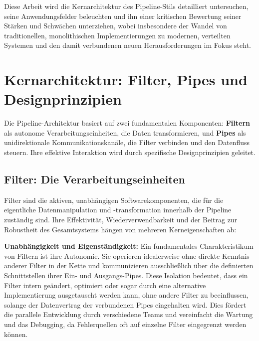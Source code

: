 \documentclass[10pt]{article}
\begin{document}
\begin{multicols}{2}
Diese Arbeit wird die Kernarchitektur des Pipeline-Stils detailliert untersuchen, seine Anwendungsfelder beleuchten und ihn einer kritischen Bewertung seiner Stärken und Schwächen unterziehen, wobei insbesondere der Wandel von traditionellen, monolithischen Implementierungen zu modernen, verteilten Systemen und den damit verbundenen neuen Herausforderungen im Fokus steht.

\section{Kernarchitektur: Filter, Pipes und Designprinzipien}
Die Pipeline-Architektur basiert auf zwei fundamentalen Komponenten: \textbf{Filtern} als autonome Verarbeitungseinheiten, die Daten transformieren, und \textbf{Pipes} als unidirektionale Kommunikationskanäle, die Filter verbinden und den Datenfluss steuern.\cite{richards2020, oreilly_python_pipes} Ihre effektive Interaktion wird durch spezifische Designprinzipien geleitet.

\subsection{Filter: Die Verarbeitungseinheiten}
Filter sind die aktiven, unabhängigen Softwarekomponenten, die für die eigentliche Datenmanipulation und -transformation innerhalb der Pipeline zuständig sind.\cite{richards2020} Ihre Effektivität, Wiederverwendbarkeit und der Beitrag zur Robustheit des Gesamtsystems hängen von mehreren Kerneigenschaften ab:

\textbf{Unabhängigkeit und Eigenständigkeit:} Ein fundamentales Charakteristikum von Filtern ist ihre Autonomie. Sie operieren idealerweise ohne direkte Kenntnis anderer Filter in der Kette und kommunizieren ausschließlich über die definierten Schnittstellen ihrer Ein- und Ausgangs-Pipes. Diese Isolation bedeutet, dass ein Filter intern geändert, optimiert oder sogar durch eine alternative Implementierung ausgetauscht werden kann, ohne andere Filter zu beeinflussen, solange der Datenvertrag der verbundenen Pipes eingehalten wird. Dies fördert die parallele Entwicklung durch verschiedene Teams und vereinfacht die Wartung und das Debugging, da Fehlerquellen oft auf einzelne Filter eingegrenzt werden können.\cite{richards2020}


\end{multicols}
\end{document}
